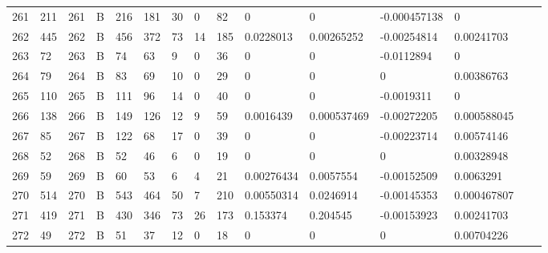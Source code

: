 \begin{longtable}{lllllllllllllll}
	261 & 211               & 261 & B   & 216               & 181               & 30                & 0    & 82         & 0              & 0              & -0.000457138  & 0            \\
	262 & 445               & 262 & B   & 456               & 372               & 73                & 14   & 185        & 0.0228013      & 0.00265252     & -0.00254814   & 0.00241703   \\
	263 & 72                & 263 & B   & 74                & 63                & 9                 & 0    & 36         & 0              & 0              & -0.0112894    & 0            \\
	264 & 79                & 264 & B   & 83                & 69                & 10                & 0    & 29         & 0              & 0              & 0             & 0.00386763   \\
	265 & 110               & 265 & B   & 111               & 96                & 14                & 0    & 40         & 0              & 0              & -0.0019311    & 0            \\
	266 & 138               & 266 & B   & 149               & 126               & 12                & 9    & 59         & 0.0016439      & 0.000537469    & -0.00272205   & 0.000588045  \\
	267 & 85                & 267 & B   & 122               & 68                & 17                & 0    & 39         & 0              & 0              & -0.00223714   & 0.00574146   \\
	268 & 52                & 268 & B   & 52                & 46                & 6                 & 0    & 19         & 0              & 0              & 0             & 0.00328948   \\
	269 & 59                & 269 & B   & 60                & 53                & 6                 & 4    & 21         & 0.00276434     & 0.0057554      & -0.00152509   & 0.0063291    \\
	270 & 514               & 270 & B   & 543               & 464               & 50                & 7    & 210        & 0.00550314     & 0.0246914      & -0.00145353   & 0.000467807  \\
	271 & 419               & 271 & B   & 430               & 346               & 73                & 26   & 173        & 0.153374       & 0.204545       & -0.00153923   & 0.00241703   \\
	272 & 49                & 272 & B   & 51                & 37                & 12                & 0    & 18         & 0              & 0              & 0             & 0.00704226   \\

\end{longtable}
